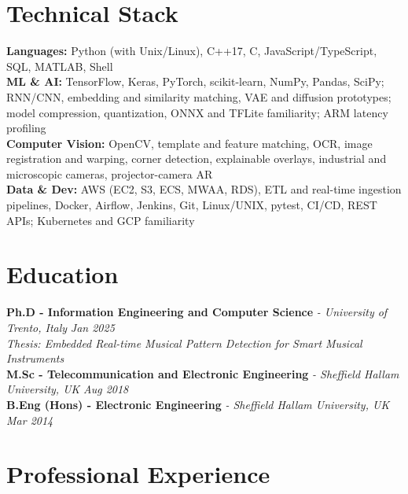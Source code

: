 \documentclass[11pt]{article}
\begin{document}
\section*{Technical Stack}

\textbf{Languages:} Python (with Unix/Linux), C++17, C, JavaScript/TypeScript, SQL, MATLAB, Shell\\
\textbf{ML \& AI:} TensorFlow, Keras, PyTorch, scikit-learn, NumPy, Pandas, SciPy; RNN/CNN, embedding and similarity matching, VAE and diffusion prototypes; model compression, quantization, ONNX and TFLite familiarity; ARM latency profiling\\
\textbf{Computer Vision:} OpenCV, template and feature matching, OCR, image registration and warping, corner detection, explainable overlays, industrial and microscopic cameras, projector-camera AR\\
\textbf{Data \& Dev:} AWS (EC2, S3, ECS, MWAA, RDS), ETL and real-time ingestion pipelines, Docker, Airflow, Jenkins, Git, Linux/UNIX, pytest, CI/CD, REST APIs; Kubernetes and GCP familiarity

\section*{Education}
\textbf{Ph.D - Information Engineering and Computer Science} \textit{\small{ - University of Trento, Italy}} \hfill \textit{Jan 2025}\\[2pt]
\noindent\textit{\small Thesis: Embedded Real-time Musical Pattern Detection for Smart Musical Instruments}\\[3pt]
\noindent\textbf{M.Sc - Telecommunication and Electronic Engineering} \textit{\small{ - Sheffield Hallam University, UK}} \hfill \textit{Aug 2018}\\[3pt]
\noindent\textbf{B.Eng (Hons) - Electronic Engineering} \textit{\small{ - Sheffield Hallam University, UK}} \hfill \textit{Mar 2014}

\section*{Professional Experience}
\end{document}
